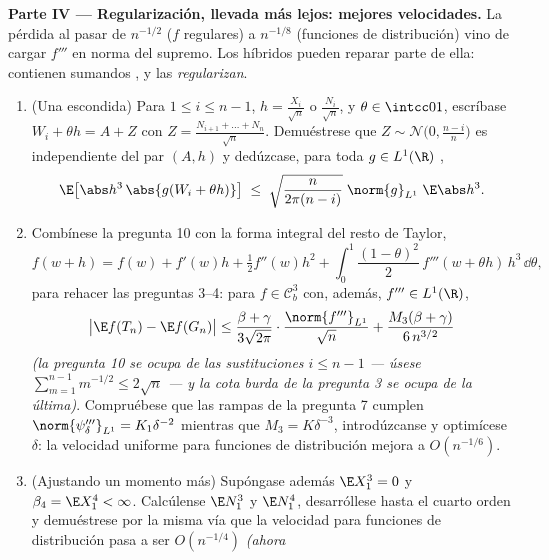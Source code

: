 \begin{problem}
\medskip
\noindent\textbf{Parte IV --- Regularización, llevada más lejos: mejores
velocidades.} La pérdida al pasar de $n^{-1/2}$ ($f$ regulares) a
$n^{-1/8}$ (funciones de distribución) vino de cargar $f'''$ en norma
del supremo. Los híbridos pueden reparar parte de ella: contienen
sumandos , y las
 \emph{regularizan}.
\begin{enumerate}[resume]
  \item (Una  escondida)
  Para $1 \leq i \leq n - 1$, $h =
        \frac{X_i}{\sqrt n}$ o $\frac{N_i}{\sqrt n}$, y
  $\theta \in \intcc01$, escríbase $W_i + \theta h = A +
        Z$ con $Z = \frac{N_{i+1} + \dots + N_n}{\sqrt
        n}$. Demuéstrese que $Z \sim \mathcal N\bigl(0,
        \frac{n-i}n\bigr)$ es
  independiente del par $(A,
        h)$ y dedúzcase, para toda $g \in
        L^1(\R)$ ,
        \[
        \E\bigl[\abs h^3\,\abs{g(W_i + \theta h)}\bigr]
        \;\leq\; \sqrt{\frac{n}{2\pi(n - i)}}\;
        \norm{g}_{L^1}\;\E\abs h^3 .
        \]
  \item Combínese la pregunta 10 con la forma integral del resto de
  Taylor,
        \[
        f(w + h) = f(w) + f'(w)h + \tfrac12f''(w)h^2 +
        \int_0^1\frac{(1 - \theta)^2}2\,f'''(w + \theta
        h)\,h^3\,\dd\theta,
        \]
        para rehacer las preguntas 3--4: para $f \in \mathcal C^3_b$
        con, además, $f''' \in L^1(\R)$,
        \[
        \bigl|\E f(T_n) - \E f(G_n)\bigr| \leq
        \frac{\beta + \gamma}{3\sqrt{2\pi}}\cdot
        \frac{\norm{f'''}_{L^1}}{\sqrt n} +
        \frac{M_3(\beta + \gamma)}{6\,n^{3/2}}
        \]
        \emph{(la pregunta 10 se ocupa de las sustituciones
        $i \leq n - 1$ --- úsese
        $\sum_{m=1}^{n-1}m^{-1/2} \leq 2\sqrt n$ --- y la cota burda de
        la pregunta 3 se ocupa de la última)}. Compruébese que las
        rampas de la pregunta 7 cumplen
        $\norm{\psi_\delta'''}_{L^1} = K_1\delta^{-2}$
        mientras que $M_3 = K\delta^{-3}$, introdúzcanse y optimícese
        $\delta$: la velocidad uniforme para funciones de distribución
        mejora a
        $O(n^{-1/6})$.
  \item (Ajustando un momento más) Supóngase además $\E
        X_1^3 = 0$ y $\beta_4 = \E X_1^4 < \infty$. Calcúlense
  $\E N_1^3$ y $\E N_1^4$, desarróllese hasta el cuarto orden y
  demuéstrese por la misma vía que la velocidad para funciones de
  distribución pasa a ser $O(n^{-1/4})$ \emph{(ahora
}
\end{enumerate}
\end{problem}
